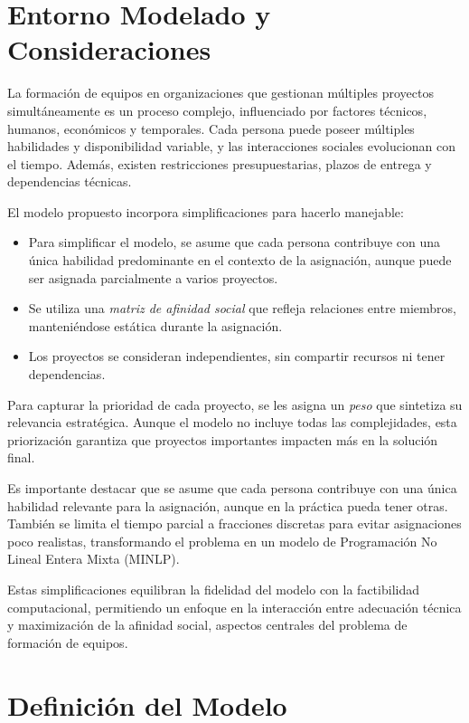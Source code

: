 \documentclass[conference]{IEEEtran}
\begin{document}
\section{Entorno Modelado y Consideraciones}

La formación de equipos en organizaciones que gestionan múltiples proyectos simultáneamente es un proceso complejo, influenciado por factores técnicos, humanos, económicos y temporales. Cada persona puede poseer múltiples habilidades y disponibilidad variable, y las interacciones sociales evolucionan con el tiempo. Además, existen restricciones presupuestarias, plazos de entrega y dependencias técnicas.

El modelo propuesto incorpora simplificaciones para hacerlo manejable:
\begin{itemize}
    \item Para simplificar el modelo, se asume que cada persona contribuye con una única habilidad predominante en el contexto de la asignación, aunque puede ser asignada parcialmente a varios proyectos.
    \item Se utiliza una \textit{matriz de afinidad social} \cite{gutierrez2016multiple} que refleja relaciones entre miembros, manteniéndose estática durante la asignación.
    \item Los proyectos se consideran independientes, sin compartir recursos ni tener dependencias.
\end{itemize}

Para capturar la prioridad de cada proyecto, se les asigna un \textit{peso} que sintetiza su relevancia estratégica. Aunque el modelo no incluye todas las complejidades, esta priorización garantiza que proyectos importantes impacten más en la solución final.

Es importante destacar que se asume que cada persona contribuye con una única habilidad relevante para la asignación, aunque en la práctica pueda tener otras. También se limita el tiempo parcial a fracciones discretas para evitar asignaciones poco realistas, transformando el problema en un modelo de Programación No Lineal Entera Mixta (MINLP).

Estas simplificaciones equilibran la fidelidad del modelo con la factibilidad computacional, permitiendo un enfoque en la interacción entre adecuación técnica y maximización de la afinidad social, aspectos centrales del problema de formación de equipos.

\section{Definición del Modelo}
\end{document}
